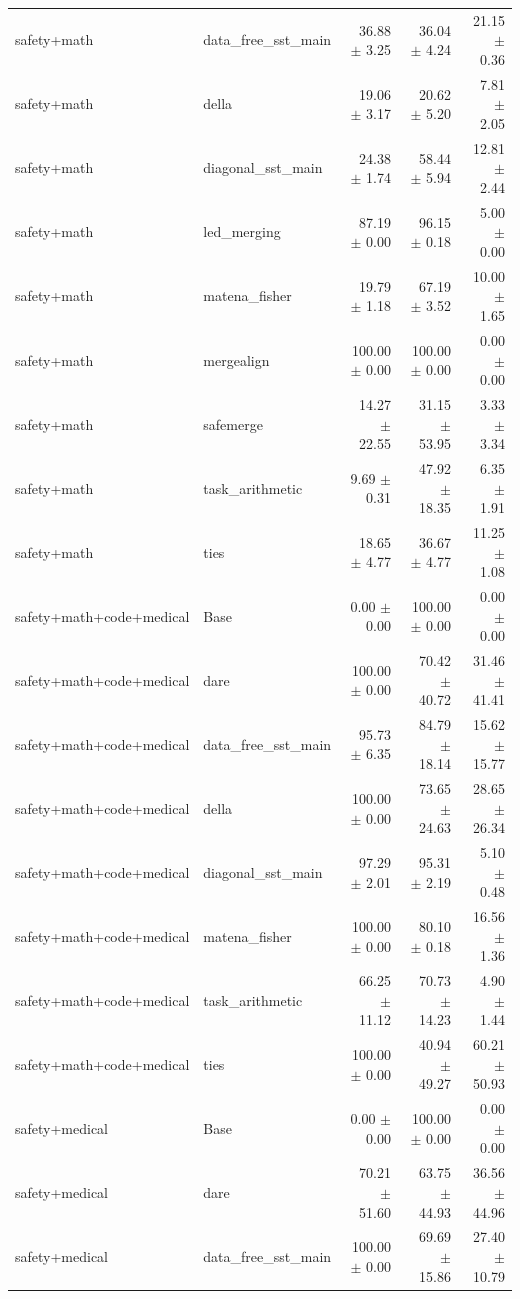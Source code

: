 \documentclass{article}
\begin{document}
\begin{table}[H]
{\begin{tabular}{llrrr}
safety+math & data\_free\_sst\_main & 36.88 $\pm$ 3.25 & 36.04 $\pm$ 4.24 & 21.15 $\pm$ 0.36 \\
safety+math & della & 19.06 $\pm$ 3.17 & 20.62 $\pm$ 5.20 & 7.81 $\pm$ 2.05 \\
safety+math & diagonal\_sst\_main & 24.38 $\pm$ 1.74 & 58.44 $\pm$ 5.94 & 12.81 $\pm$ 2.44 \\
safety+math & led\_merging & 87.19 $\pm$ 0.00 & 96.15 $\pm$ 0.18 & 5.00 $\pm$ 0.00 \\
safety+math & matena\_fisher & 19.79 $\pm$ 1.18 & 67.19 $\pm$ 3.52 & 10.00 $\pm$ 1.65 \\
safety+math & mergealign & 100.00 $\pm$ 0.00 & 100.00 $\pm$ 0.00 & 0.00 $\pm$ 0.00 \\
safety+math & safemerge & 14.27 $\pm$ 22.55 & 31.15 $\pm$ 53.95 & 3.33 $\pm$ 3.34 \\
safety+math & task\_arithmetic & 9.69 $\pm$ 0.31 & 47.92 $\pm$ 18.35 & 6.35 $\pm$ 1.91 \\
safety+math & ties & 18.65 $\pm$ 4.77 & 36.67 $\pm$ 4.77 & 11.25 $\pm$ 1.08 \\
safety+math+code+medical & Base & 0.00 $\pm$ 0.00 & 100.00 $\pm$ 0.00 & 0.00 $\pm$ 0.00 \\
safety+math+code+medical & dare & 100.00 $\pm$ 0.00 & 70.42 $\pm$ 40.72 & 31.46 $\pm$ 41.41 \\
safety+math+code+medical & data\_free\_sst\_main & 95.73 $\pm$ 6.35 & 84.79 $\pm$ 18.14 & 15.62 $\pm$ 15.77 \\
safety+math+code+medical & della & 100.00 $\pm$ 0.00 & 73.65 $\pm$ 24.63 & 28.65 $\pm$ 26.34 \\
safety+math+code+medical & diagonal\_sst\_main & 97.29 $\pm$ 2.01 & 95.31 $\pm$ 2.19 & 5.10 $\pm$ 0.48 \\
safety+math+code+medical & matena\_fisher & 100.00 $\pm$ 0.00 & 80.10 $\pm$ 0.18 & 16.56 $\pm$ 1.36 \\
safety+math+code+medical & task\_arithmetic & 66.25 $\pm$ 11.12 & 70.73 $\pm$ 14.23 & 4.90 $\pm$ 1.44 \\
safety+math+code+medical & ties & 100.00 $\pm$ 0.00 & 40.94 $\pm$ 49.27 & 60.21 $\pm$ 50.93 \\
safety+medical & Base & 0.00 $\pm$ 0.00 & 100.00 $\pm$ 0.00 & 0.00 $\pm$ 0.00 \\
safety+medical & dare & 70.21 $\pm$ 51.60 & 63.75 $\pm$ 44.93 & 36.56 $\pm$ 44.96 \\
safety+medical & data\_free\_sst\_main & 100.00 $\pm$ 0.00 & 69.69 $\pm$ 15.86 & 27.40 $\pm$ 10.79 \\

\end{tabular}}
\end{table}
\end{document}
